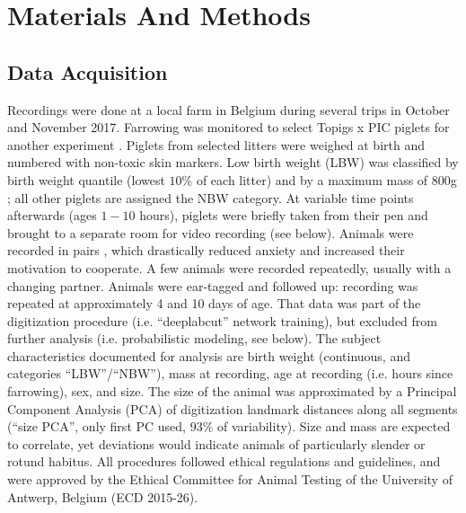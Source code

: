 \FloatBarrier
\clearpage
\section{Materials And Methods}
\label{methods_22}

\subsection{Data Acquisition}
\label{sec:orgd0bae22}

Recordings were done at a local farm in Belgium during several trips in October and November 2017.
Farrowing was monitored to select Topigs x PIC piglets for another experiment \citep{Ayuso2021}.
Piglets from selected litters were weighed at birth and numbered with non-toxic skin markers.
Low birth weight (LBW) was classified by birth weight quantile (lowest \(10 \%\) of each litter) and by a maximum mass of \(800\)g \citep{Litten2003,VanTichelen2021,Wang2016,DInca2011}; all other piglets are assigned the NBW category.
At variable time points afterwards (ages \(1 - 10\) hours), piglets were briefly taken from their pen and brought to a separate room for video recording (see below).
Animals were recorded in pairs \citep[as in][]{Mielke2018}, which drastically reduced anxiety and increased their motivation to cooperate.
A few animals were recorded repeatedly, usually with a changing partner.
Animals were ear-tagged and followed up: recording was repeated at approximately 4 and 10 days of age.
That data was part of the digitization procedure (i.e. ``deeplabcut'' network training), but excluded from further analysis (i.e. probabilistic modeling, see below).
The subject characteristics documented for analysis are birth weight (continuous, and categories ``LBW''/``NBW''), mass at recording, age at recording (i.e. hours since farrowing), sex, and size.
The size of the animal was approximated by a Principal Component Analysis (PCA) of digitization landmark distances along all segments (``size PCA'', only first PC used,
\(93 \%\)
of variability).
Size and mass are expected to correlate, yet deviations would indicate animals of particularly slender or rotund habitus.
All procedures followed ethical regulations and guidelines, and were approved by the Ethical Committee for Animal Testing of the University of Antwerp, Belgium (ECD 2015-26).



